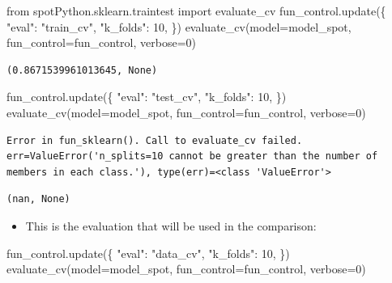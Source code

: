 \documentclass[
  letterpaper,
  DIV=11,
  numbers=noendperiod]{scrreprt}
\newenvironment{Shaded}{\begin{snugshade}}{\end{snugshade}}
\newcommand{\DecValTok}[1]{\textcolor[rgb]{0.68,0.00,0.00}{#1}}
\newcommand{\ImportTok}[1]{\textcolor[rgb]{0.00,0.46,0.62}{#1}}
\newcommand{\NormalTok}[1]{\textcolor[rgb]{0.00,0.23,0.31}{#1}}
\newcommand{\OperatorTok}[1]{\textcolor[rgb]{0.37,0.37,0.37}{#1}}
\newcommand{\StringTok}[1]{\textcolor[rgb]{0.13,0.47,0.30}{#1}}
\providecommand{\tightlist}{%
  \setlength{\itemsep}{0pt}\setlength{\parskip}{0pt}}\usepackage{longtable,booktabs,array}
\begin{document}
\begin{Shaded}
\begin{Highlighting}[]
\ImportTok{from}\NormalTok{ spotPython.sklearn.traintest }\ImportTok{import}\NormalTok{ evaluate\_cv}
\NormalTok{fun\_control.update(\{}
     \StringTok{"eval"}\NormalTok{: }\StringTok{"train\_cv"}\NormalTok{,}
     \StringTok{"k\_folds"}\NormalTok{: }\DecValTok{10}\NormalTok{,}
\NormalTok{\})}
\NormalTok{evaluate\_cv(model}\OperatorTok{=}\NormalTok{model\_spot, fun\_control}\OperatorTok{=}\NormalTok{fun\_control, verbose}\OperatorTok{=}\DecValTok{0}\NormalTok{)}
\end{Highlighting}
\end{Shaded}

\begin{verbatim}
(0.8671539961013645, None)
\end{verbatim}

\begin{Shaded}
\begin{Highlighting}[]
\NormalTok{fun\_control.update(\{}
     \StringTok{"eval"}\NormalTok{: }\StringTok{"test\_cv"}\NormalTok{,}
     \StringTok{"k\_folds"}\NormalTok{: }\DecValTok{10}\NormalTok{,}
\NormalTok{\})}
\NormalTok{evaluate\_cv(model}\OperatorTok{=}\NormalTok{model\_spot, fun\_control}\OperatorTok{=}\NormalTok{fun\_control, verbose}\OperatorTok{=}\DecValTok{0}\NormalTok{)}
\end{Highlighting}
\end{Shaded}

\begin{verbatim}
Error in fun_sklearn(). Call to evaluate_cv failed. err=ValueError('n_splits=10 cannot be greater than the number of members in each class.'), type(err)=<class 'ValueError'>
\end{verbatim}

\begin{verbatim}
(nan, None)
\end{verbatim}

\begin{itemize}
\tightlist
\item
  This is the evaluation that will be used in the comparison:
\end{itemize}

\begin{Shaded}
\begin{Highlighting}[]
\NormalTok{fun\_control.update(\{}
     \StringTok{"eval"}\NormalTok{: }\StringTok{"data\_cv"}\NormalTok{,}
     \StringTok{"k\_folds"}\NormalTok{: }\DecValTok{10}\NormalTok{,}
\NormalTok{\})}
\NormalTok{evaluate\_cv(model}\OperatorTok{=}\NormalTok{model\_spot, fun\_control}\OperatorTok{=}\NormalTok{fun\_control, verbose}\OperatorTok{=}\DecValTok{0}\NormalTok{)}
\end{Highlighting}
\end{Shaded}
\end{document}
